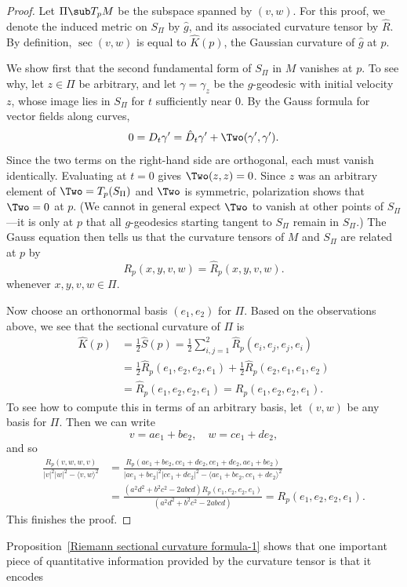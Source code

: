 \begin{proof}
Let $\Pi\sub T_pM$ be the subspace spanned by $(v,w)$. For this proof, we denote the induced metric on $S_{\Pi}$ by $\hat{g}$, and its associated curvature tensor by $\hat{R}$. By definition, $\sec(v,w)$ is equal to $\hat{K}(p)$, the Gaussian curvature of $\hat{g}$ at $p$.\par
We show first that the second fundamental form of $S_{\Pi}$ in $M$ vanishes at $p$. To see why, let $z\in\Pi$ be arbitrary, and let $\gamma=\gamma_z$ be the $g$-geodesic with initial velocity $z$, whose image lies in $S_{\Pi}$ for $t$ sufficiently near $0$. By the Gauss formula for vector fields along curves,
\[0=D_t\gamma'=\hat{D}_t\gamma'+\Two(\gamma',\gamma').\]
Since the two terms on the right-hand side are orthogonal, each must vanish identically. Evaluating at $t=0$ gives $\Two(z,z)=0$. Since $z$ was an arbitrary element of $\Two=T_p(S_{\Pi})$ and $\Two$ is symmetric, polarization shows that $\Two=0$ at $p$. (We cannot in general expect $\Two$ to vanish at other points of $S_{\Pi}$---it is only at $p$ that all 
$g$-geodesics starting tangent to $S_{\Pi}$ remain in $S_{\Pi}$.) The Gauss equation then tells us that the curvature tensors of $M$ and $S_{\Pi}$ are related at $p$ by
\[R_p(x,y,v,w)=\hat{R}_p(x,y,v,w).\]
whenever $x,y,v,w\in\Pi$.\par
Now choose an orthonormal basis $(e_1,e_2)$ for $\Pi$. Based on the observations above, we see that the sectional curvature of $\Pi$ is
\begin{align*}
\hat{K}(p)&=\frac{1}{2}\hat{S}(p)=\frac{1}{2}\sum_{i,j=1}^{2}\hat{R}_p(e_i,e_j,e_j,e_i)\\
&=\frac{1}{2}\hat{R}_p(e_1,e_2,e_2,e_1)+\frac{1}{2}\hat{R}_p(e_2,e_1,e_1,e_2)\\
&=\hat{R}_p(e_1,e_2,e_2,e_1)=R_p(e_1,e_2,e_2,e_1).
\end{align*}
To see how to compute this in terms of an arbitrary basis, let $(v,w)$ be any basis for $\Pi$. Then we can write
\[v=ae_1+be_2,\quad w=ce_1+de_2,\]
and so
\begin{align*}
\frac{R_p(v,w,w,v)}{|v|^2|w|^2-\langle v,w\rangle^2}&=\frac{R_p(ae_1+be_2,ce_1+de_2,ce_1+de_2,ae_1+be_2)}{|ae_1+be_2|^2|ce_1+de_2|^2-\langle ae_1+be_2,ce_1+de_2\rangle^2}\\
&=\frac{(a^2d^2+b^2c^2-2abcd)R_p(e_1,e_2,e_2,e_1)}{(a^2d^2+b^2c^2-2abcd)}=R_p(e_1,e_2,e_2,e_1).
\end{align*}
This finishes the proof.
\end{proof}
Proposition~\ref{Riemann sectional curvature formula-1} shows that one important piece of quantitative information provided by the curvature tensor is that it encodes 
